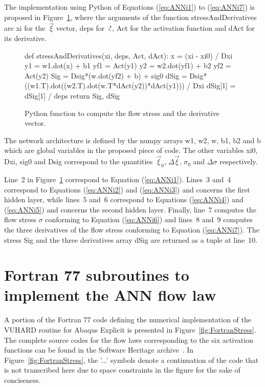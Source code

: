 \documentclass[algorithms,article,submit,pdftex,oneauthors]{Definitions/mdpi}
\DeclareRobustCommand{\mdot}[1]{\accentset{\mbox{\bfseries .}}{#1}}
\DeclareRobustCommand{\var}[1]{\textsf{#1}}
\begin{document}
The implementation using Python of Equations (\ref{eq:ANNi1}) to (\ref{eq:ANNi7}) is proposed in Figure~\ref{fig:PythonStress}, where the arguments of the function \var{stressAndDerivatives} are \var{xi} for the~$\overrightarrow{\xi}$ vector, \var{deps} for~$\mdot{\varepsilon}$, \var{Act} for the activation function and \var{dAct} for its derivative.
\begin{figure}[h!]
\begin{PythonListing}
def stressAndDerivatives(xi, deps, Act, dAct):
  x = (xi - xi0) / Dxi
  y1 = w1.dot(x) + b1
  yf1 = Act(y1)
  y2 = w2.dot(yf1) + b2
  yf2 = Act(y2)
  Sig = Dsig*(w.dot(yf2) + b) + sig0
  dSig = Dsig*((w1.T).dot((w2.T).dot(w.T*dAct(y2))*dAct(y1))) / Dxi
  dSig[1] = dSig[1] / deps
  return Sig, dSig
\end{PythonListing}
\caption{Python function to compute the flow stress and the derivative vector.\label{fig:PythonStress}}
\end{figure}
The network architecture is defined by the numpy arrays \var{w1}, \var{w2}, \var{w}, \var{b1}, \var{b2} and \var{b} which are global variables in the proposed piece of code.
The other variables \var{xi0}, \var{Dxi}, \var{sig0} and \var{Dsig} correspond to the quantities~$\overrightarrow{\xi}_{0}$, $\Delta\overrightarrow{\xi}$, $\sigma_{0}$ and $\Delta\sigma$ respectively.

Line~2 in Figure~\ref{fig:PythonStress} correspond to Equation (\ref{eq:ANNi1}).
Lines~3 and~4 correspond to Equations (\ref{eq:ANNi2}) and (\ref{eq:ANNi3}) and concerns the first hidden layer, while lines~5 and~6 correspond to Equations (\ref{eq:ANNi4}) and (\ref{eq:ANNi5}) and concerns the second hidden layer.
Finally, line~7 computes the flow stress $\sigma$ conforming to Equation (\ref{eq:ANNi6}) and lines~8 and~9 computes the three derivatives of the flow stress conforming to Equation (\ref{eq:ANNi7}).
The stress \var{Sig} and the three derivatives array \var{dSig} are returned as a tuple at line~10.

\section[\appendixname~\thesection]{Fortran 77 subroutines to implement the ANN flow law\label{sec:Appendix2}}

A portion of the Fortran 77 code defining the numerical implementation of the VUHARD routine for Abaqus Explicit is presented in Figure~\ref{fig:FortranStress}.
The complete source codes for the flow laws corresponding to the six activation functions can be found in the Software Heritage archive~\cite{Pantale-2023-SSF}.
In Figure~\ref{fig:FortranStress}, the '...' symbols denote a continuation of the code that is not transcribed here due to space constraints in the figure for the sake of conciseness.
\end{document}
